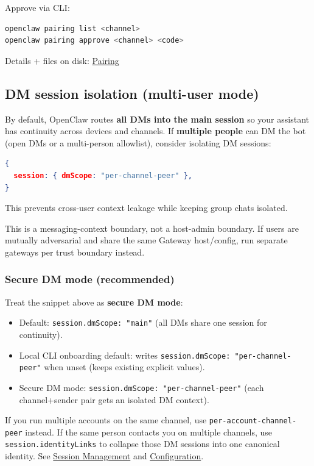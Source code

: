 Approve via CLI:

\begin{lstlisting}[language=bash]
openclaw pairing list <channel>
openclaw pairing approve <channel> <code>
\end{lstlisting}


Details + files on disk: \href{/channels/pairing}{Pairing}

\subsection{DM session isolation (multi-user mode)}


By default, OpenClaw routes \textbf{all DMs into the main session} so your assistant has continuity across devices and channels. If \textbf{multiple people} can DM the bot (open DMs or a multi-person allowlist), consider isolating DM sessions:

\begin{lstlisting}[language=json]
{
  session: { dmScope: "per-channel-peer" },
}
\end{lstlisting}


This prevents cross-user context leakage while keeping group chats isolated.

This is a messaging-context boundary, not a host-admin boundary. If users are mutually adversarial and share the same Gateway host/config, run separate gateways per trust boundary instead.

\subsubsection{Secure DM mode (recommended)}


Treat the snippet above as \textbf{secure DM mode}:

\begin{itemize}
  \item Default: \texttt{session.dmScope: "main"} (all DMs share one session for continuity).
  \item Local CLI onboarding default: writes \texttt{session.dmScope: "per-channel-peer"} when unset (keeps existing explicit values).
  \item Secure DM mode: \texttt{session.dmScope: "per-channel-peer"} (each channel+sender pair gets an isolated DM context).
\end{itemize}


If you run multiple accounts on the same channel, use \texttt{per-account-channel-peer} instead. If the same person contacts you on multiple channels, use \texttt{session.identityLinks} to collapse those DM sessions into one canonical identity. See \href{/concepts/session}{Session Management} and \href{/gateway/configuration}{Configuration}.

